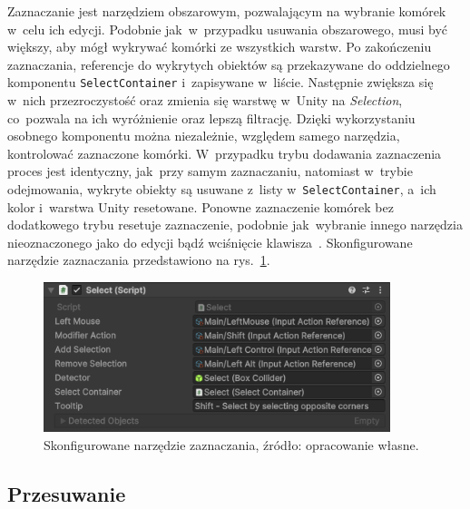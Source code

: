 Zaznaczanie jest narzędziem obszarowym, pozwalającym na wybranie komórek w~celu ich edycji.
Podobnie jak~w~przypadku usuwania obszarowego,
 musi być większy,
aby mógł wykrywać komórki ze wszystkich warstw.
Po zakończeniu zaznaczania,
referencje do wykrytych obiektów są przekazywane do oddzielnego komponentu \texttt{SelectContainer}
i~zapisywane w~liście.
Następnie zwiększa się w~nich przezroczystość oraz zmienia się warstwę w~Unity na \textit{Selection},
co~pozwala na ich wyróżnienie oraz lepszą filtrację.
Dzięki wykorzystaniu osobnego komponentu można niezależnie,
względem samego narzędzia,
kontrolować zaznaczone komórki.
W~przypadku trybu dodawania zaznaczenia proces jest identyczny, jak~przy samym zaznaczaniu,
natomiast w~trybie odejmowania,
wykryte obiekty są usuwane z~listy w~\texttt{SelectContainer}, a~ich kolor i~warstwa Unity resetowane.
Ponowne zaznaczenie komórek bez dodatkowego trybu resetuje zaznaczenie,
podobnie jak~wybranie innego narzędzia nieoznaczonego jako do edycji bądź wciśnięcie klawisza~.
Skonfigurowane narzędzie zaznaczania przedstawiono na rys.~\ref{fig:select}.

\begin{figure}[h!]
    \centering
    \includegraphics[width=0.9\textwidth]{chapters/chapter4/rys/tools/select}
    \caption[Skonfigurowane narzędzie zaznaczania.]{Skonfigurowane narzędzie zaznaczania, źródło: opracowanie własne.}
    \label{fig:select}
\end{figure}

\subsection{Przesuwanie}
\label{subsec:przesuwanie}

